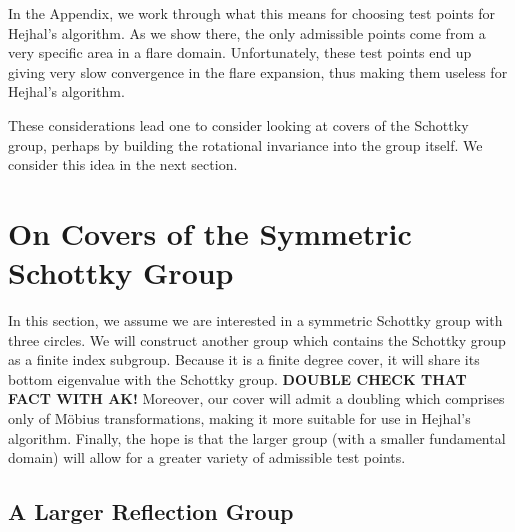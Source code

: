 \documentclass[]{article}
\begin{document}
In the Appendix, we work through what this means for choosing test points for Hejhal's algorithm.
As we show there, the only admissible points come from a very specific area in a flare domain.
Unfortunately, these test points end up giving very slow convergence in the flare expansion, thus making them useless for Hejhal's algorithm.

These considerations lead one to consider looking at covers of the Schottky group, perhaps by building the rotational invariance into the group itself.
We consider this idea in the next section.

\section*{On Covers of the Symmetric Schottky Group}

In this section, we assume we are interested in a symmetric Schottky group with three circles.
We will construct another group which contains the Schottky group as a finite index subgroup.
Because it is a finite degree cover, it will share its bottom eigenvalue with the Schottky group.
\textbf{DOUBLE CHECK THAT FACT WITH AK!}
Moreover, our cover will admit a doubling which comprises only of M\"obius transformations, making it more suitable for use in Hejhal's algorithm.
Finally, the hope is that the larger group (with a smaller fundamental domain) will allow for a greater variety of admissible test points.

\subsection*{A Larger Reflection Group}
\end{document}
